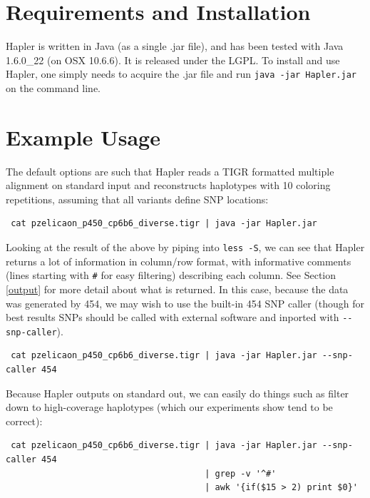 \documentclass[11pt]{llncs}
\begin{document}
\newpage

\section{Requirements and Installation}
\label{requirementsAndInstallation}

Hapler is written in Java (as a single .jar file), and has been tested with Java 1.6.0\_22 (on OSX 10.6.6). It is released under the LGPL. To install
and use Hapler, one simply needs to acquire the .jar file and run \texttt{java -jar Hapler.jar} on the command line.





\newpage

\section{Example Usage} 
\label{exampleUsage}

The default options are such that Hapler reads a TIGR formatted multiple alignment on standard input and reconstructs 
haplotypes with 10 coloring repetitions, assuming that all variants define SNP locations:


\begin{verbatim}
 cat pzelicaon_p450_cp6b6_diverse.tigr | java -jar Hapler.jar
\end{verbatim}

Looking at the result of the above by piping into \verb=less -S=, we can see that Hapler returns a lot of information in column/row format, with 
informative comments (lines starting with \verb=#= for easy filtering) describing each column. See Section \ref{output} for more detail about what is 
returned. In this case, because the data was generated by 454, we may wish to use the built-in 454 SNP caller (though for best results SNPs should be
called with external software and inported with \verb=--snp-caller=).

\begin{verbatim}
 cat pzelicaon_p450_cp6b6_diverse.tigr | java -jar Hapler.jar --snp-caller 454
\end{verbatim}

Because Hapler outputs on standard out, we can easily do things such as filter down to high-coverage haplotypes (which our experiments show tend to be
correct):

\begin{verbatim}
 cat pzelicaon_p450_cp6b6_diverse.tigr | java -jar Hapler.jar --snp-caller 454 
                                       | grep -v '^#' 
                                       | awk '{if($15 > 2) print $0}'
\end{verbatim}
\end{document}
